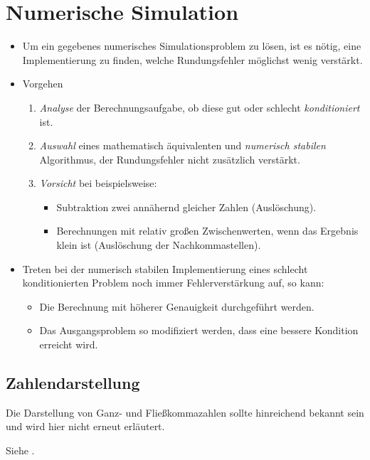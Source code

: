 \chapter{Numerische Simulation} %
	\label{c:numerischesimulation}

	\begin{itemize}
		\item Um ein gegebenes numerisches Simulationsproblem zu lösen, ist es nötig, eine Implementierung zu finden, welche Rundungsfehler möglichst wenig verstärkt.
		\item Vorgehen
			\begin{enumerate}
				\item \textit{Analyse} der Berechnungsaufgabe, ob diese gut oder schlecht \textit{konditioniert} ist.
				\item \textit{Auswahl} eines mathematisch äquivalenten und \textit{numerisch stabilen} Algorithmus, der Rundungsfehler nicht zusätzlich verstärkt.
				\item \textit{Vorsicht} bei beispielsweise:
					\begin{itemize}
						\item Subtraktion zwei annähernd gleicher Zahlen (Auslöschung).
						\item Berechnungen mit relativ großen Zwischenwerten, wenn das Ergebnis klein ist (Auslöschung der Nachkommastellen).
					\end{itemize}
			\end{enumerate}
		\item Treten bei der numerisch stabilen Implementierung eines schlecht konditionierten Problem noch immer Fehlerverstärkung auf, so kann:
			\begin{itemize}
				\item Die Berechnung mit höherer Genauigkeit durchgeführt werden.
				\item Das Ausgangsproblem so modifiziert werden, dass eine bessere Kondition erreicht wird.
			\end{itemize}
	\end{itemize}

	\section{Zahlendarstellung} %
		Die Darstellung von Ganz- und Fließkommazahlen sollte hinreichend bekannt sein und wird hier nicht erneut erläutert.

		Siehe .

